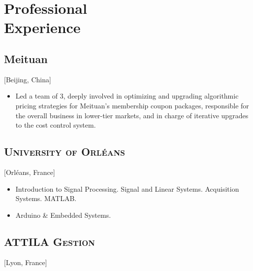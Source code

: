 \documentclass{mycv}
\begin{document}
\vspace{-\parskip}

\section{Professional \\ Experience}

\subsection{\large Meituan}[Beijing, China]

\vspace{0.3em}

\begin{positions}
\end{positions}

\begin{itemize}
  \item Led a team of 3, deeply involved in optimizing and upgrading algorithmic pricing strategies for Meituan's membership coupon packages, responsible for the overall business in lower-tier markets, and in charge of iterative upgrades to the cost control system.
\end{itemize}

\vspace{-\parskip}

\subsection{\large \scshape University of Orl\'eans}[Orl\'eans, France]

\begin{positions}
\end{positions}

\begin{itemize}
  \itemsep 0.3em
  \item Introduction to Signal Processing. Signal and Linear Systems. Acquisition Systems. MATLAB.
  \item Arduino \& Embedded Systems.
\end{itemize}

\vspace{-\parskip}

\subsection{\large \scshape ATTILA Gestion}[Lyon, France]
\end{document}
